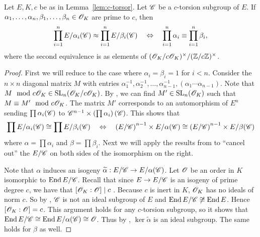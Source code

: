 \documentclass{amsart}
\begin{document}
\begin{lemma}\label{lem:prod-equiv-torsor}
  Let $E,K,c$ be as in Lemma~\ref{lem:c-torsor}. Let $\mathscr{C}$ be a $c$-torsion subgroup of $E$. If $\alpha_1,\dots,\alpha_n,\beta_1,\dots,\beta_n \in \mathscr{O}_K$ are prime to $c$, then
  \[
    \prod_{i=1}^n E/\alpha_i(\mathscr{C}) \approx \prod_{i=1}^n E/\beta_i(\mathscr{C})
    \quad\Leftrightarrow\quad
    \prod_{i=1}^n \alpha_i \equiv \prod_{i=1}^n \beta_i,
  \]
  where the second equivalence is as elements of $(\mathscr{O}_K/c\mathscr{O}_K)^\times/(\mathbb{Z}/c\mathbb{Z})^\times$.
\end{lemma}
\begin{proof}
  First we will reduce to the case where $\alpha_i = \beta_i = 1$ for $i < n$. Consider the $n \times n$ diagonal matrix $M$ with entries $\alpha_1^{-1},\alpha_2^{-1},\dots,\alpha_{n-1}^{-1}, (\alpha_1 \cdots \alpha_{n-1})$. Note that $M\mod{c\mathscr{O}_K} \in \operatorname{SL}_n(\mathscr{O}_K/c\mathscr{O}_K)$. By \cite[Cor.~5.2, Pg.~18]{ktheory1964bass}, we can find $M' \in \operatorname{SL}_n(\mathscr{O}_K)$ such that $M \equiv M' \mod{c\mathscr{O}_K}$. The matrix $M'$ corresponds to an automorphism of $E^n$ sending $\prod \alpha_i(\mathscr{C})$ to $\mathscr{C}^{n-1} \times \left(\prod \alpha_i\right)(\mathscr{C})$. This shows that
  \[
    \prod E/\alpha_i(\mathscr{C}) \cong \prod E/\beta_i(\mathscr{C})
    \quad\Leftrightarrow\quad
    \left(E/\mathscr{C}\right)^{n-1} \times E/\alpha(\mathscr{C}) \cong \left(E/\mathscr{C}\right)^{n-1} \times E/\beta(\mathscr{C})
  \]
  where $\alpha = \prod\alpha_i$ and $\beta = \prod \beta_i$. Next we will apply the results from \cite{kani2011products} to ``cancel out'' the $E/\mathscr{C}$ on both sides of the isomorphism on the right.

  Note that $\alpha$ induces an isogeny $\widetilde{\alpha}: E/\mathscr{C} \to E/\alpha(\mathscr{C})$. %
  Let $\mathscr{O}$ be an order in $K$ isomorphic to $\operatorname{End} E/\mathscr{C}$. Recall that since $E \to E/\mathscr{C}$ is an isogeny of prime degree $c$, we have that $[\mathscr{O}_K : \mathscr{O}] \mid c$ \cite[Prop.~5]{kohel1996endomorphism}. Because $c$ is inert in $K$, $\mathscr{O}_K$ has no ideals of norm $c$. So by \cite[Thm.~20b]{kani2011products}, $\mathscr{C}$ is not an ideal subgroup of $E$ and $\operatorname{End} E/\mathscr{C} \not\cong \operatorname{End} E$. Hence $[\mathscr{O}_K : \mathscr{O}] = c$. This argument holds for any $c$-torsion subgroup, so it shows that $\operatorname{End} E/\mathscr{C} \cong \operatorname{End} E/\alpha(\mathscr{C}) \cong \mathscr{O}$. Thus by \cite[Thm.~20b]{kani2011products}, $\ker\tilde{\alpha}$ is an ideal subgroup. The same holds for $\beta$ as well.


\end{proof}
\end{document}
